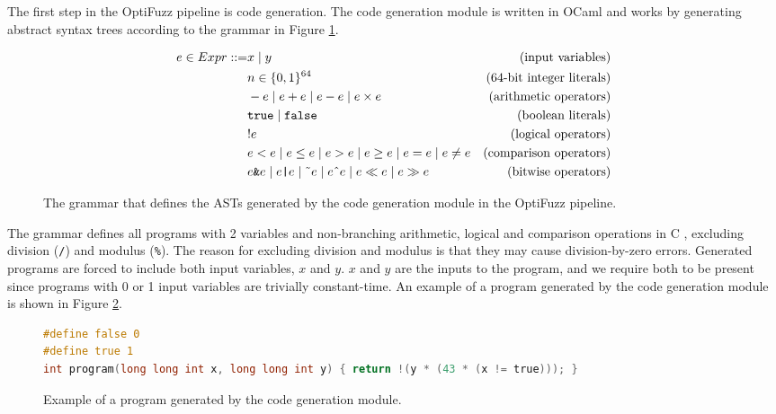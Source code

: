 \label{sec:code-generation}
The first step in the OptiFuzz pipeline is code generation. 
The code generation module is written in OCaml and works by generating abstract syntax trees according to the grammar in Figure \ref{fig:grammar}.

\begin{figure}[H]
  \centering
  \begin{align*}
    e \in Expr ::= & x \mid y &\text{(input variables)}\\
    & n \in \{0, 1\}^{64} &\text{(64-bit integer literals)}\\
    & -e \mid e + e \mid e - e \mid e \times e &\text{(arithmetic operators)}\\
    & \texttt{true} \mid \texttt{false} &\text{(boolean literals)}\\
    & !e &\text{(logical operators)}\\
    & e < e \mid e \leq e \mid e > e \mid e \geq e \mid e = e \mid e \neq e &\text{(comparison operators)}\\
    & e \texttt{\&} e \mid e \texttt{|} e \mid \text{\~{}} e \mid e \text{\^{}} e \mid e \ll e \mid e \gg e &\text{(bitwise operators)}
  \end{align*}
  \caption{The grammar that defines the ASTs generated by the code generation module in the OptiFuzz pipeline.}
  \label{fig:grammar}
\end{figure}

The grammar defines all programs with 2 variables and non-branching arithmetic, logical and comparison operations in C \citep{c-standard}, excluding division (\texttt{/}) and modulus (\texttt{\%}).
The reason for excluding division and modulus is that they may cause division-by-zero errors.
Generated programs are forced to include both input variables, $x$ and $y$.
$x$ and $y$ are the inputs to the program, and we require both to be present since programs with 0 or 1 input variables are trivially constant-time.
An example of a program generated by the code generation module is shown in Figure \ref{fig:code-gen-example}.

\begin{figure}[H]
  \begin{lstlisting}[style=defstyle,language=C, xleftmargin=0.9cm, xrightmargin=0.9cm]
#define false 0
#define true 1
int program(long long int x, long long int y) { return !(y * (43 * (x != true))); } \end{lstlisting}
  \caption{Example of a program generated by the code generation module.}
  \label{fig:code-gen-example}
\end{figure}

